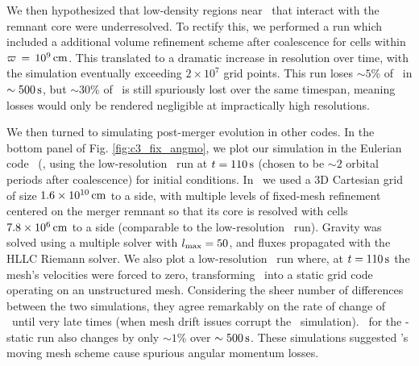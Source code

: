 We then hypothesized that low-density regions near \innercyl\ that interact with the remnant core were underresolved. To rectify this, we performed a run which included a additional volume refinement scheme after coalescence for cells within $\varpi\,=\,10^9\,\mathrm{cm}$.  This translated to a dramatic increase in resolution over time, with the simulation eventually exceeding $2\times10^7$ grid points.  This run loses $\sim5$\% of \Lztot\ in $\sim500\,\mathrm{s}$, but $\sim30$\% of \Lzinner\ is still spuriously lost over the same timespan, meaning losses would only be rendered negligible at impractically high resolutions.



We then turned to simulating post-merger evolution in other codes.  In the bottom panel of Fig. \ref{fig:c3_fix_angmo}, we plot our simulation in the Eulerian code \flash\ (\citealt{fryx+00}, using the low-resolution \arepo\ run at $t = 110\,\mathrm{s}$ (chosen to be $\sim2$ orbital periods after coalescence) for initial conditions.  In \flash\ we used a 3D Cartesian grid of size $1.6\times10^{10}\,\mathrm{cm}$ to a side, with multiple levels of fixed-mesh refinement centered on the merger remnant so that its core is resolved with cells $7.8\times10^6\,\mathrm{cm}$ to a side (comparable to the low-resolution \arepo\ run).  Gravity was solved using a multiple solver with $l_\mathrm{max} = 50$, and fluxes propagated with the HLLC Riemann solver.  We also plot a low-resolution \arepo\ run where, at $t = 110\,\mathrm{s}$ the mesh's velocities were forced to zero, transforming \arepo\ into a static grid code operating on an unstructured mesh.  Considering the sheer number of differences between the two simulations, they agree remarkably on the rate of change of \Lzinner\ until very late times (when mesh drift issues corrupt the \arepo\ simulation).  \Lztot\ for the \arepo-static run also changes by only $\sim1$\% over $\sim500\,\mathrm{s}$.  These simulations suggested \arepo's moving mesh scheme cause spurious angular momentum losses.


